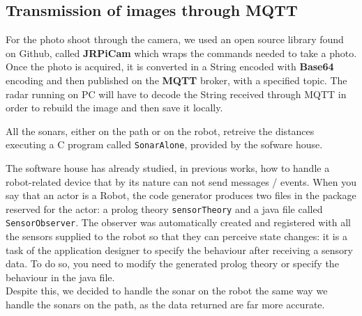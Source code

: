 \subsection{Transmission of images through MQTT}
For the photo shoot through the camera, we used an open source library found on Github, called \textbf{JRPiCam} which wraps the commands needed to take a photo. Once the photo is acquired, it is converted in a String encoded with \textbf{Base64} encoding and then published on the \textbf{MQTT} broker, with a specified topic. The radar running on PC will have to decode the String received through MQTT in order to rebuild the image and then save it locally.


All the sonars, either on the path or on the robot, retreive the distances executing a C program called \lstinline[columns=fixed, style=java]{SonarAlone}, provided by the sofware house.

The software house has already studied, in previous works, how to handle a robot-related device that by its nature can not send messages / events. When you say that an actor is a Robot, the code generator produces two files in the package reserved for the actor: a prolog theory \lstinline[columns=fixed, style=java]{sensorTheory} and a java file called \lstinline[columns=fixed, style=java]{SensorObserver}. The observer was automatically created and registered with all the sensors supplied to the robot so that they can perceive state changes: it is a task of the application designer to specify the behaviour after receiving a sensory data. To do so, you need to modify the generated prolog theory or specify the behaviour in the java file. \\
Despite this, we decided to handle the sonar on the robot the same way we handle the sonars on the path, as the data returned are far more accurate.